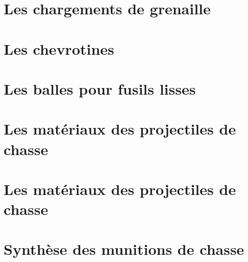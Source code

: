     \chapter{Les chargements de grenaille}
    \label{chap:chargements_grenaille}
    

    \chapter{Les chevrotines}
    \label{chap:les_chevrotines}
    

    \chapter{Les balles pour fusils lisses}
    \label{chap:les_chevrotines}
    

    \chapter{Les matériaux des projectiles de chasse}
    \label{chap:materiaux_projectiles_chasse}
    

    \chapter{Les matériaux des projectiles de chasse}
    \label{chap:designations_commerciales}
    

    \chapter{Synthèse des munitions de chasse}
    \label{chap:synthese_munitions_chasse}
    


